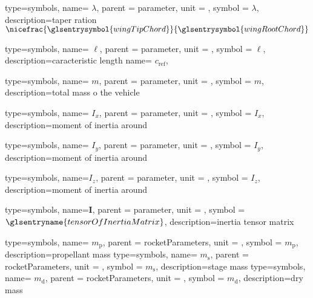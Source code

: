 {type=symbols,
  name= \ensuremath{\lambda},
  parent = {parameter},
  unit = \unexpanded{},
  symbol = \ensuremath{\lambda},
  description={taper ration $\nicefrac{\glsentrysymbol{wingTipChord}}{\glsentrysymbol{wingRootChord}}$}
}

{type=symbols,
  name= \ensuremath{\ell},
  parent = {parameter},
  unit = \unexpanded{\si{\meter}},
  symbol = \ensuremath{\ell},
  description={caracteristic length}
}
  name= \ensuremath{c_{\text{ref}}},


{type=symbols,
  name= \ensuremath{m},
  parent = {parameter},
  unit = \unexpanded{\si{\kilogram}},
  symbol = \ensuremath{m},
  description={total mass o the vehicle}
}

{type=symbols,
  name= \ensuremath{I_{x}},
  parent = {parameter},
  unit = \unexpanded{\si{\kilogram\meter\squared}},
  symbol = \ensuremath{I_{x}},
  description={moment of inertia around }
}


{type=symbols,
  name= \ensuremath{I_{y}},
  parent = {parameter},
  unit = \unexpanded{\si{\kilogram\meter\squared}},
  symbol = \ensuremath{I_{y}},
  description={moment of inertia around }
}

{type=symbols,
  name=\ensuremath{I_{z}},
  parent = {parameter},
  unit = \unexpanded{\si{\kilogram\meter\squared}},
  symbol = \ensuremath{I_{z}},
  description={moment of inertia around }
}


{type=symbols,
  name=\ensuremath{\mathbf{I}},
  parent = {parameter},
  unit = \unexpanded{\si{\kilogram\meter\squared}},
  symbol = \ensuremath{\glsentryname{tensorOfInertiaMatrix}},
  description={inertia tensor matrix}
}

{type=symbols,
  name= \ensuremath{m_\mathrm{p}},
  parent = {rocketParameters},
  unit = \unexpanded{\si{\kilogram}},
  symbol = \ensuremath{m_\mathrm{p}},
  description={propellant mass}
}
{type=symbols,
  name= \ensuremath{m_\mathrm{s}},
  parent = {rocketParameters},
  unit = \unexpanded{\si{\kilogram}},
  symbol = \ensuremath{m_\mathrm{s}},
  description={stage mass}
}
{type=symbols,
  name= \ensuremath{{m}_\mathrm{d}},
  parent = {rocketParameters},
  unit = \unexpanded{\si{\kilogram}},
  symbol = \ensuremath{{m}_\mathrm{d}},
  description={dry mass}
}

